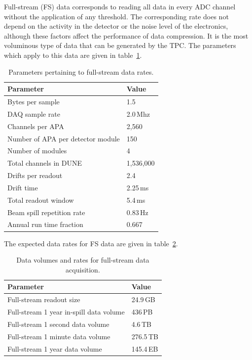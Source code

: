 Full-stream (FS) data corresponds to reading all data in every ADC channel without
the application of any threshold. The corresponding rate does not depend on the 
activity in the detector or the noise
level of the electronics, although these factors affect the performance of data compression.
It is the most voluminous type of data
that can be generated by the TPC. The parameters which apply to this data are given in
table~\ref{tab:full-stream-parameters}.

\begin{table}[ht!]
	\centering
	\begin{tabular}{| p{3in} | p{1.1in} |}
		\hline

	\textbf{Parameter} & \textbf{Value} \\ \hline
	
	Bytes per sample & 1.5 \\ \hline
	
	DAQ sample rate & 2.0\,Mhz \\ \hline
	
	Channels per APA & 2,560 \\ \hline
	
	Number of APA per detector module & 150 \\ \hline
	
	Number of modules & 4 \\ \hline
	
	Total channels in DUNE & 1,536,000 \\ \hline \hline
	
	Drifts per readout & 2.4 \\ \hline
	
	Drift time & 2.25\,ms \\ \hline

	Total readout window & 5.4\,ms \\ \hline \hline
	
	Beam spill repetition rate & 0.83\,Hz \\ \hline
	
	Annual run time fraction & 0.667 \\ \hline
	\end{tabular}
	\caption{Parameters pertaining to full-stream data rates.}
	\label{tab:full-stream-parameters}
\end{table}
The expected data rates for FS data are given
in table~\ref{tab:full-stream-volume}.
\begin{table}[ht!]
	\centering
	\begin{tabular}{| p{3in} | p{1.1in} |}
		\hline	
	
	\textbf{Parameter} & \textbf{Value} \\ \hline
	Full-stream readout size & 24.9\,GB \\ \hline
	Full-stream 1 year in-spill data volume & 436\,PB \\ \hline
	Full-stream 1 second data volume & 4.6\,TB \\
	Full-stream 1 minute data volume & 276.5\,TB \\	\hline
	Full-stream 1 year data volume & 145.4\,EB \\ \hline
	\end{tabular}
	\caption{Data volumes and rates for full-stream data acquisition.}
	\label{tab:full-stream-volume}
\end{table}
